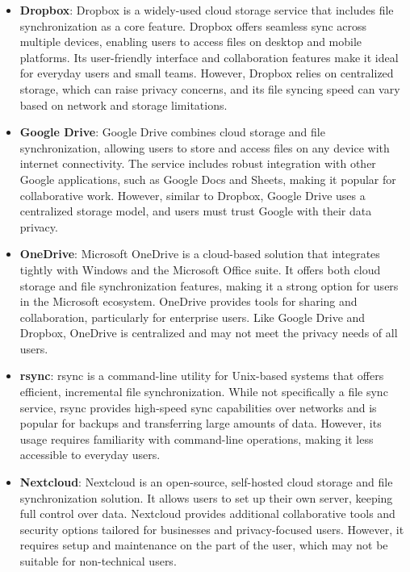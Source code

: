 \documentclass{book}
\begin{document}
\begin{itemize}
\begin{itemize}
      \item \textbf{Dropbox}: Dropbox is a widely-used cloud storage service that includes file synchronization as a core feature. Dropbox offers seamless sync across multiple devices, enabling users to access files on desktop and mobile platforms. Its user-friendly interface and collaboration features make it ideal for everyday users and small teams. However, Dropbox relies on centralized storage, which can raise privacy concerns, and its file syncing speed can vary based on network and storage limitations.

      \item \textbf{Google Drive}: Google Drive combines cloud storage and file synchronization, allowing users to store and access files on any device with internet connectivity. The service includes robust integration with other Google applications, such as Google Docs and Sheets, making it popular for collaborative work. However, similar to Dropbox, Google Drive uses a centralized storage model, and users must trust Google with their data privacy.

      \item \textbf{OneDrive}: Microsoft OneDrive is a cloud-based solution that integrates tightly with Windows and the Microsoft Office suite. It offers both cloud storage and file synchronization features, making it a strong option for users in the Microsoft ecosystem. OneDrive provides tools for sharing and collaboration, particularly for enterprise users. Like Google Drive and Dropbox, OneDrive is centralized and may not meet the privacy needs of all users.

      \item \textbf{rsync}: rsync is a command-line utility for Unix-based systems that offers efficient, incremental file synchronization. While not specifically a file sync service, rsync provides high-speed sync capabilities over networks and is popular for backups and transferring large amounts of data. However, its usage requires familiarity with command-line operations, making it less accessible to everyday users. 

      \item \textbf{Nextcloud}: Nextcloud is an open-source, self-hosted cloud storage and file synchronization solution. It allows users to set up their own server, keeping full control over data. Nextcloud provides additional collaborative tools and security options tailored for businesses and privacy-focused users. However, it requires setup and maintenance on the part of the user, which may not be suitable for non-technical users.
  \end{itemize}


\end{itemize}
\end{document}
